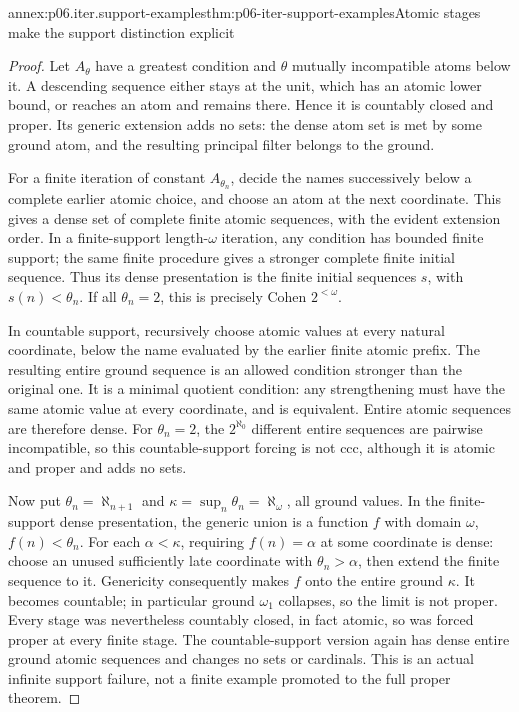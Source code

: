 \begin{annexitem}{annex:p06.iter.support-examples}{thm:p06-iter-support-examples}{Atomic stages make the support distinction explicit}
\begin{proof}
Let \(A_\theta\) have a greatest condition and \(\theta\) mutually
incompatible atoms below it. A descending sequence either stays at the
unit, which has an atomic lower bound, or reaches an atom and remains
there. Hence it is countably closed and proper. Its generic extension
adds no sets: the dense atom set is met by some ground atom, and the
resulting principal filter belongs to the ground.

For a finite iteration of constant \(A_{\theta_n}\), decide the names
successively below a complete earlier atomic choice, and choose an atom
at the next coordinate. This gives a dense set of complete finite
atomic sequences, with the evident extension order. In a finite-support
length-\(\omega\) iteration, any condition has bounded finite support;
the same finite procedure gives a stronger complete finite initial
sequence. Thus its dense presentation is the finite initial sequences
\(s\), with \(s(n)<\theta_n\). If all \(\theta_n=2\), this is
precisely Cohen \(2^{<\omega}\).

In countable support, recursively choose atomic values at every natural
coordinate, below the name evaluated by the earlier finite atomic
prefix. The resulting entire ground sequence is an allowed condition
stronger than the original one. It is a minimal quotient condition:
any strengthening must have the same atomic value at every coordinate,
and is equivalent. Entire atomic sequences are therefore dense.
For \(\theta_n=2\), the \(2^{\aleph_0}\) different entire sequences
are pairwise incompatible, so this countable-support forcing is not ccc,
although it is atomic and proper and adds no sets.

Now put \(\theta_n=\aleph_{n+1}\) and
\(\kappa=\sup_n\theta_n=\aleph_\omega\), all ground values.
In the finite-support dense presentation, the generic union is a function
\(f\) with domain \(\omega\), \(f(n)<\theta_n\). For each
\(\alpha<\kappa\), requiring \(f(n)=\alpha\) at some coordinate
is dense: choose an unused sufficiently late coordinate with
\(\theta_n>\alpha\), then extend the finite sequence to it.
Genericity consequently makes \(f\) onto the entire ground \(\kappa\).
It becomes countable; in particular ground \(\omega_1\) collapses,
so the limit is not proper. Every stage was nevertheless countably
closed, in fact atomic, so was forced proper at every finite stage.
The countable-support version again has dense entire ground atomic
sequences and changes no sets or cardinals. This is an actual infinite
support failure, not a finite example promoted to the full proper theorem.
\end{proof}
\end{annexitem}

